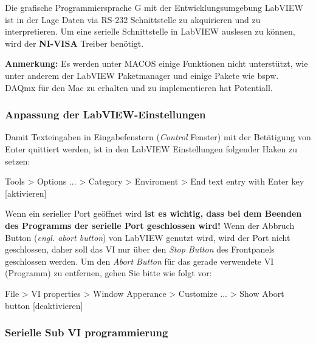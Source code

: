Die grafische Programmiersprache G mit der Entwicklungsumgebung LabVIEW ist in der Lage Daten via RS-232 Schnittstelle zu akquirieren und zu interpretieren. Um eine serielle Schnittstelle in LabVIEW auslesen zu können, wird der \textbf{NI-VISA} Treiber benötigt. 

\footnotesize \singlespacing

 \noindent \textbf{Anmerkung:} Es werden unter MACOS einige Funktionen nicht unterstützt, wie unter anderem der LabVIEW Paketmanager und einige Pakete wie bspw. DAQmx für den Mac zu erhalten und zu implementieren hat \glqq Potentiall\grqq{}.

\normalsize \onehalfspacing


\subsubsection{Anpassung der LabVIEW-Einstellungen}
\label{sec:LabVIEW_Einstellungen}

Damit Texteingaben in Eingabefenstern (\textit{Control} Fenster) mit der Betätigung von Enter quittiert werden, ist in den LabVIEW Einstellungen folgender Haken zu setzen:

\begin{center}  %
Tools > Options ... > Category > Enviroment > End text entry with Enter key [aktivieren]
\end{center} 

\noindent Wenn ein serieller Port geöffnet wird \textbf{ist es wichtig, dass bei dem Beenden des Programms der serielle Port geschlossen wird!} Wenn der Abbruch Button (\textit{engl. abort button}) von LabVIEW genutzt wird, wird der Port nicht geschlossen, daher soll das VI nur über den \textit{Stop Button} des Frontpanels geschlossen werden. Um den \textit{Abort Button} für das gerade verwendete VI (Programm) zu entfernen, gehen Sie bitte wie folgt vor:

\begin{center} %
File > VI properties > Window Apperance > Customize ... >  Show Abort button [deaktivieren]
\end{center} 


 
\subsubsection{Serielle Sub VI programmierung}


